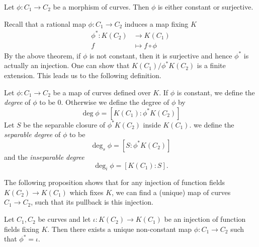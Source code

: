 \begin{theorem}
	Let $\phi: C_1 \to C_2$ be a morphism of curves. Then $\phi$ is either
	constant or surjective.
\end{theorem}

Recall that a rational map $\phi: C_1 \to C_2$ induces a map fixing $K$
\begin{align*}
	\phi^*: K(C_2) &\to K(C_1)\\
	f &\mapsto f\circ\phi
\end{align*}
By the above theorem, if $\phi$ is not constant, then it is surjective
and hence $\phi^*$ is actually an injection.
One can show that $K(C_1) / \phi^*K(C_2)$ is a finite extension. This leads
us to the following definition.

\begin{definition}
	Let $\phi: C_1 \to C_2$ be a map of curves defined over $K$.
	If $\phi$ is constant, we define the \emph{degree} of $\phi$ to be $0$.
	Otherwise we define the degree of $\phi$ by
	\begin{equation*}
		\deg\phi = [K(C_1): \phi^*K(C_2)]
	\end{equation*}
	Let $S$ be the separable closure of $\phi^*K(C_2)$ inside $K(C_1)$.
	we define the \emph{separable degree} of $\phi$ to be
	\begin{equation*}
		\deg_s\phi = [S: \phi^*K(C_2)]
	\end{equation*}
	and the \emph{inseparable degree}
	\begin{equation*}
		\deg_i\phi = [K(C_1): S].
	\end{equation*}
\end{definition}

The following proposition
shows that for any injection of function fields $K(C_2) \to K(C_1)$
which fixes $K$, we
can find a (unique)
map of curves $C_1 \to C_2$, such that its pullback is this
injection. 

\begin{proposition}
	\label{prop:existence-inclusion}
	Let $C_1, C_2$ be curves and
	let $\iota: K(C_2) \to K(C_1)$ be an injection of function fields
	fixing $K$. Then there exists a unique non-constant map $\phi: C_1 \to C_2$
	such that $\phi^* = \iota$.
\end{proposition}

